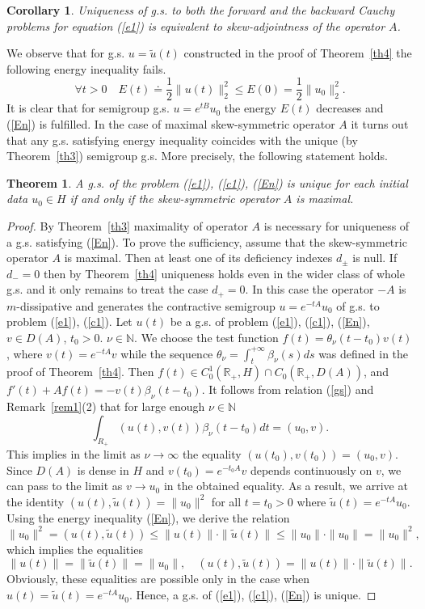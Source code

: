 \documentclass[12pt]{article}
\newcommand{\R}{{\mathbb R}}
\newcommand{\N}{{\mathbb N}}
\numberwithin{equation}{section}
\theoremstyle{plain}
\newtheorem{theorem}{Theorem}[section]
\newtheorem{corollary}{Corollary}[section]
\theoremstyle{definition}
\begin{document}
\begin{corollary}\label{cor1} Uniqueness of g.s. to both the forward and the backward Cauchy problems for equation (\ref{e1}) is equivalent to skew-adjointness of the operator $A$.
\end{corollary}

We observe that for g.s. $u=\tilde u(t)$ constructed in the proof of Theorem~\ref{th4} the following energy inequality fails.
\begin{equation}\label{En}
\forall t>0 \quad E(t)\doteq\frac{1}{2}\|u(t)\|_2^2\le E(0)=\frac{1}{2}\|u_0\|_2^2.
\end{equation}
It is clear that for semigroup g.s. $u=e^{tB}u_0$ the energy $E(t)$ decreases and (\ref{En}) is fulfilled.
In the case of maximal skew-symmetric operator $A$ it turns out that any g.s. satisfying energy inequality coincides with the unique (by Theorem~\ref{th3}) semigroup g.s. More precisely, the following statement holds.

\begin{theorem}\label{th5}
A g.s. of the problem (\ref{e1}), (\ref{c1}), (\ref{En}) is unique for each initial data $u_0\in H$ if and only if the skew-symmetric operator $A$ is maximal.
\end{theorem}

\begin{proof}
By Theorem~\ref{th3} maximality of operator $A$ is necessary for uniqueness of a g.s. satisfying (\ref{En}).
To prove the sufficiency, assume that the skew-symmetric operator $A$ is maximal. Then at least one of its deficiency indexes $d_\pm$ is null. If $d_-=0$ then by Theorem~\ref{th4} uniqueness holds even in the wider class of whole g.s. and it only remains to treat the case $d_+=0$. In this case the operator $-A$ is $m$-dissipative and generates the contractive semigroup $u=e^{-tA}u_0$ of g.s. to problem (\ref{e1}), (\ref{c1}). Let $u(t)$ be a g.s. of problem (\ref{e1}), (\ref{c1}), (\ref{En}), $v\in D(A)$, $t_0>0$. $\nu\in\N$. We choose the test function $f(t)=\theta_\nu(t-t_0)v(t)$, where $v(t)=e^{-tA}v$ while the sequence $\theta_\nu=\int_t^{+\infty} \beta_\nu(s)ds$ was defined in the proof of Theorem~\ref{th4}. Then $f(t)\in C_0^1(\R_+,H)\cap C_0(\R_+,D(A))$, and $f'(t)+Af(t)=-v(t)\beta_\nu(t-t_0)$. It follows from relation (\ref{gs}) and Remark~\ref{rem1}(2) that for large enough $\nu\in\N$
\[
\int_{R_+} (u(t),v(t))\beta_\nu(t-t_0)dt=(u_0,v).
\]
This implies in the limit as $\nu\to\infty$ the equality $(u(t_0),v(t_0))=(u_0,v)$. Since $D(A)$ is dense in $H$ and  $v(t_0)=e^{-t_0A}v$ depends continuously on $v$, we can pass to the limit as $v\to u_0$ in the obtained equality. As a result, we arrive at the identity $(u(t),\tilde u(t))=\|u_0\|^2$ for all $t=t_0>0$ where $\tilde u(t)=e^{-tA}u_0$. Using the energy inequality (\ref{En}), we derive the relation
\[\|u_0\|^2=(u(t),\tilde u(t))\le\|u(t)\|\cdot\|\tilde u(t)\|\le\|u_0\|\cdot\|u_0\|=\|u_0\|^2,
\]
which implies the equalities
\[\|u(t)\|=\|\tilde u(t)\|=\|u_0\|, \quad (u(t),\tilde u(t))=\|u(t)\|\cdot\|\tilde u(t)\|. \]
Obviously, these equalities are possible only in the case when $u(t)=\tilde u(t)=e^{-tA}u_0$. Hence, a g.s. of (\ref{e1}), (\ref{c1}), (\ref{En}) is unique.
\end{proof}
\end{document}
